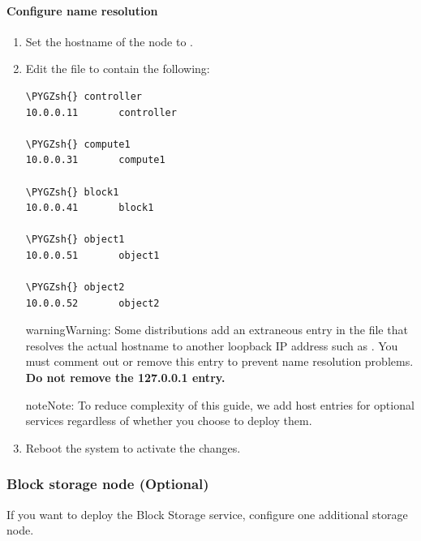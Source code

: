 \documentclass[letterpaper,10pt,english]{sphinxmanual}
\def\PYGZsh{\char`\#}
\begin{document}
\paragraph{Configure name resolution}
\label{_source/installation_guide/environment-networking-compute:configure-name-resolution}\begin{enumerate}
\item {} 
Set the hostname of the node to .

\item {} 
Edit the  file to contain the following:

\begin{Verbatim}[commandchars=\\\{\}]
\PYGZsh{} controller
10.0.0.11       controller

\PYGZsh{} compute1
10.0.0.31       compute1

\PYGZsh{} block1
10.0.0.41       block1

\PYGZsh{} object1
10.0.0.51       object1

\PYGZsh{} object2
10.0.0.52       object2
\end{Verbatim}

\begin{notice}{warning}{Warning:}
Some distributions add an extraneous entry in the 
file that resolves the actual hostname to another loopback IP
address such as . You must comment out or remove this
entry to prevent name resolution problems. \textbf{Do not remove the
127.0.0.1 entry.}
\end{notice}

\begin{notice}{note}{Note:}
To reduce complexity of this guide, we add host entries for optional
services regardless of whether you choose to deploy them.
\end{notice}

\item {} 
Reboot the system to activate the changes.

\end{enumerate}


\subsubsection{Block storage node (Optional)}
\label{_source/installation_guide/environment-networking-storage-cinder:block-storage-node-optional}\label{_source/installation_guide/environment-networking-storage-cinder::doc}
If you want to deploy the Block Storage service, configure one
additional storage node.
\end{document}
